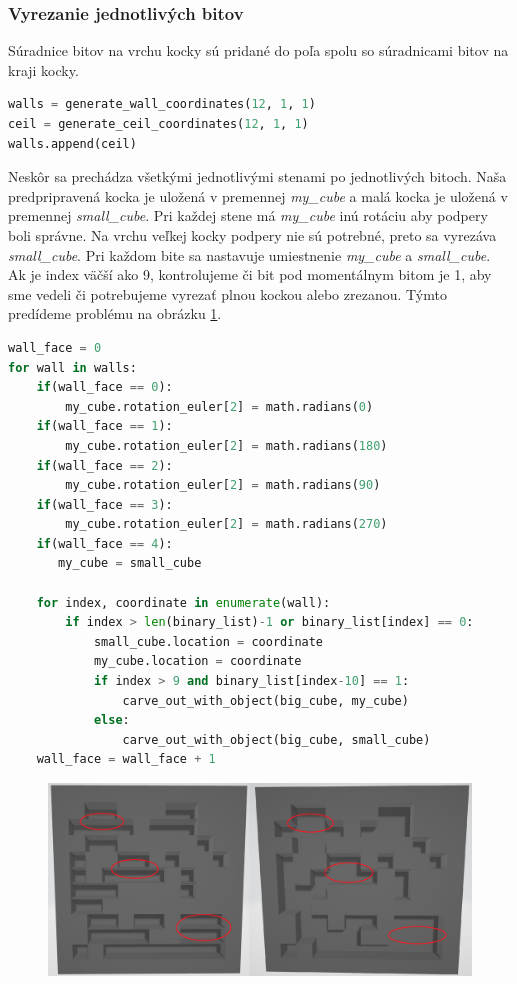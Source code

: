 \subsubsection{Vyrezanie jednotlivých bitov}
Súradnice bitov na vrchu kocky sú pridané do poľa spolu so súradnicami bitov na kraji kocky.
\begin{lstlisting}[language=Python]
walls = generate_wall_coordinates(12, 1, 1)
ceil = generate_ceil_coordinates(12, 1, 1)
walls.append(ceil)
\end{lstlisting}
Neskôr sa prechádza všetkými jednotlivými stenami po jednotlivých bitoch. Naša predpripravená kocka je uložená v premennej \textit{my\_cube} a malá kocka je uložená v premennej \textit{small\_cube}. Pri každej stene má \textit{my\_cube} inú rotáciu aby podpery boli správne. Na vrchu veľkej kocky podpery nie sú potrebné, preto sa vyrezáva \textit{small\_cube}. Pri každom bite sa nastavuje umiestnenie \textit{my\_cube} a \textit{small\_cube}. Ak je index väčší ako 9, kontrolujeme či bit pod momentálnym bitom je 1, aby sme vedeli či potrebujeme vyrezať plnou kockou alebo zrezanou. Týmto predídeme problému na obrázku \ref{fig:problem_podpier}.
\begin{lstlisting}[language=Python]
wall_face = 0
for wall in walls:
    if(wall_face == 0):
        my_cube.rotation_euler[2] = math.radians(0)
    if(wall_face == 1):
        my_cube.rotation_euler[2] = math.radians(180)
    if(wall_face == 2):
        my_cube.rotation_euler[2] = math.radians(90)
    if(wall_face == 3):
        my_cube.rotation_euler[2] = math.radians(270)
    if(wall_face == 4):
       my_cube = small_cube
            
    for index, coordinate in enumerate(wall):
        if index > len(binary_list)-1 or binary_list[index] == 0:
            small_cube.location = coordinate
            my_cube.location = coordinate
            if index > 9 and binary_list[index-10] == 1:
                carve_out_with_object(big_cube, my_cube)
            else:
                carve_out_with_object(big_cube, small_cube)
    wall_face = wall_face + 1
\end{lstlisting}
\begin{figure}[H]
    \centering
    \includegraphics[scale=0.3]{includes/pictures/odstranenie_podpier.png}
    \label{fig:problem_podpier}
\end{figure}


